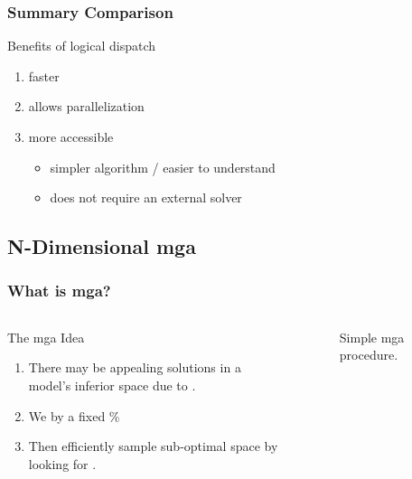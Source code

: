 \begin{frame}
    \frametitle{Summary Comparison}

    Benefits of logical dispatch

    \begin{enumerate}
        \item faster
        \item allows parallelization
        \item more accessible
        \begin{itemize}
            \item simpler algorithm / easier to understand
            \item does not require an external solver
        \end{itemize}
    \end{enumerate}

\end{frame}


\subsection{N-Dimensional \gls{mga}}

\begin{frame}
    \frametitle{What is \gls{mga}?}

    \begin{columns}
        \column[t]{3.5cm}
        \begin{block}{The \gls{mga} Idea}
            \begin{enumerate}[<+->]
                \item There may be appealing solutions in a model's inferior
                space due to .
                \item We  by a fixed \% 
                \item Then efficiently sample sub-optimal space by looking for
                 \cite{decarolis_using_2011}.
            \end{enumerate}    
        \end{block}
    \column[t]{7cm}
        \begin{figure}
            \centering
            \resizebox{\columnwidth}{!}{}
            \caption{Simple \gls{mga} procedure.}
        \end{figure}
    \end{columns}
\end{frame}


